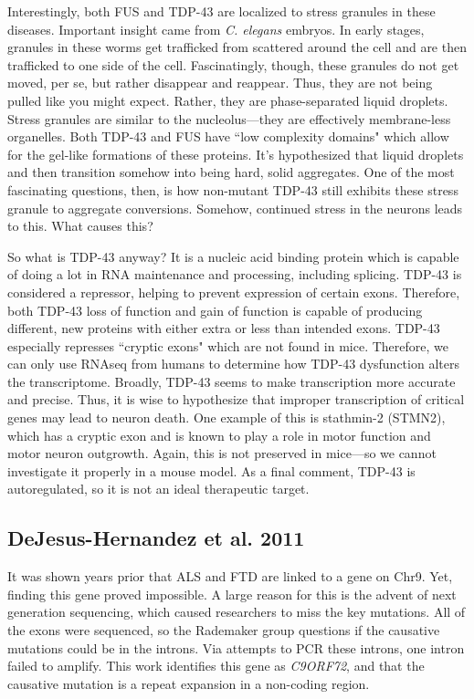 Interestingly, both FUS and TDP-43 are localized to stress granules in these diseases. Important insight came from \textit{C. elegans} embryos. In early stages, granules in these worms get trafficked from scattered around the cell and are then trafficked to one side of the cell. Fascinatingly, though, these granules do not get moved, per se, but rather disappear and reappear. Thus, they are not being pulled like you might expect. Rather, they are phase-separated liquid droplets. Stress granules are similar to the nucleolus---they are effectively membrane-less organelles. Both TDP-43 and FUS have ``low complexity domains" which allow for the gel-like formations of these proteins. It's hypothesized that liquid droplets and then transition somehow into being hard, solid aggregates. One of the most fascinating questions, then, is how non-mutant TDP-43 still exhibits these stress granule to aggregate conversions. Somehow, continued stress in the neurons leads to this. What causes this?\newline

So what is TDP-43 anyway? It is  a nucleic acid binding protein which is capable of doing a lot in RNA maintenance and processing, including splicing. TDP-43 is considered a repressor, helping to prevent expression of certain exons. Therefore, both TDP-43 loss of function and gain of function is capable of producing different, new proteins with either extra or less than intended exons. TDP-43 especially represses ``cryptic exons" which are not found in mice. Therefore, we can only use RNAseq from humans to determine how TDP-43 dysfunction alters the transcriptome. Broadly, TDP-43 seems to make transcription more accurate and precise. Thus, it is wise to hypothesize that improper transcription of critical genes may lead to neuron death. One example of this is stathmin-2 (STMN2), which has a cryptic exon and is known to play a role in motor function and motor neuron outgrowth. Again, this is not preserved in mice---so we cannot investigate it properly in a mouse model. As a final comment, TDP-43 is autoregulated, so it is not an ideal therapeutic target. 


\subsection*{DeJesus-Hernandez et al. 2011}

It was shown years prior that ALS and FTD are linked to a gene on Chr9. Yet, finding this gene proved impossible. A large reason for this is the advent of next generation sequencing, which caused researchers to miss the key mutations. All of the exons were sequenced, so the Rademaker group questions if the causative mutations could be in the introns. Via attempts to PCR these introns, one intron failed to amplify. This work identifies this gene as \textit{C9ORF72}, and that the causative mutation is a repeat expansion in a non-coding region. 

